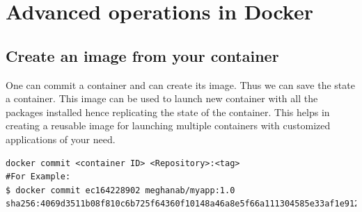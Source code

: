 \documentclass[11pt]{article}
\begin{document}
\section{Advanced operations in Docker}
\label{sec:orgheadline37}
\subsection{Create an image from your container}
\label{sec:orgheadline21}
One can commit a container and can create its image. Thus we can save the state
a container. This image can be used to launch new container with all the
packages installed hence replicating the state of the container. This helps
in creating a reusable image for launching multiple containers with
customized applications of your need. 

\begin{verbatim}
docker commit <container ID> <Repository>:<tag>
#For Example:
$ docker commit ec164228902 meghanab/myapp:1.0
sha256:4069d3511b08f810c6b725f64360f10148a46a8e5f66a111304585e33af1e912
\end{verbatim}
\end{document}
